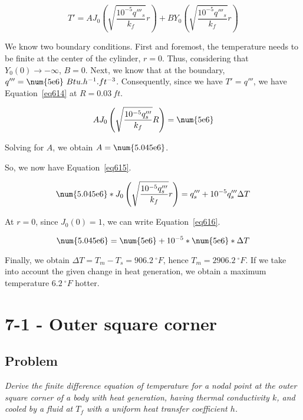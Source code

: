 \begin{equation}\label{eq613}
T' = AJ_0 \left( \sqrt{\frac{10^{-5}q'''_s}{k_f}} r \right) + BY_0 \left( \sqrt{\frac{10^{-5}q'''_s}{k_f}} r\right)
\end{equation}

We know two boundary conditions. First and foremost, the temperature needs to be finite at the center of the cylinder, $r=0$. Thus, considering that $Y_0(0) \rightarrow -\infty$, $B=0$. Next, we know that at the boundary, $q''' = \text{\num{5e6}}\ Btu.h^{-1}.ft^{-3}$. Consequently, since we have $T' = q'''$, we have Equation~\ref{eq614} at $R = 0.03\ ft$.


\begin{equation}\label{eq614}
AJ_0 \left( \sqrt{\frac{10^{-5}q'''_s}{k_f}} R \right) = \text{\num{5e6}}
\end{equation}

Solving for $A$, we obtain $A = \text{\num{5.045e6}}$.

So, we now have Equation~\ref{eq615}.


\begin{equation}\label{eq615}
\text{\num{5.045e6}} * J_0 \left( \sqrt{\frac{10^{-5}q'''_s}{k_f}} r \right) = q'''_s + 10^{-5}q'''_s\Delta T
\end{equation}

At $r=0$, since $J_0(0) = 1$, we can write Equation~\ref{eq616}.

\begin{equation}\label{eq616}
\text{\num{5.045e6}} = \text{\num{5e6}} + 10^{-5} * \text{\num{5e6}} * \Delta T
\end{equation}

Finally, we obtain $\Delta T = T_m - T_s = 906.2\ {}^\circ F$, hence $T_m = 2906.2\ {}^\circ F$. If we take into account the given change in heat generation, we obtain a maximum temperature $6.2\ {}^\circ F$ hotter.

\section{7-1 - Outer square corner}
\label{prob62}

\subsection{Problem}
\textit{Derive the finite difference equation of temperature for a nodal point at the outer square corner of a body with heat generation, having thermal conductivity $k$, and cooled by a fluid at $T_f$ with a uniform heat transfer coefficient $h$.}

